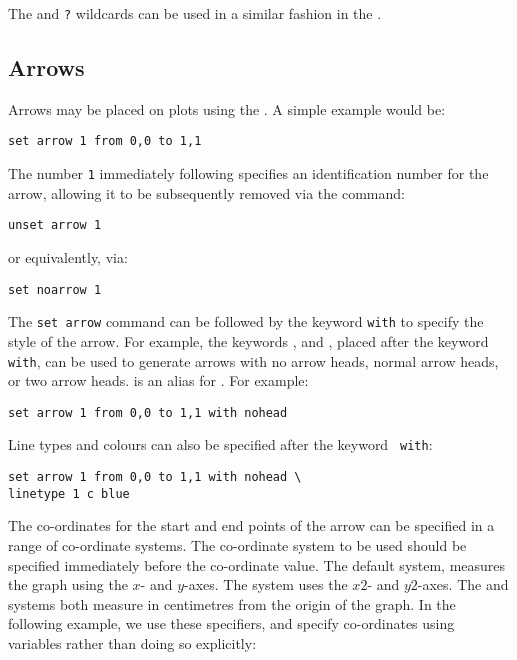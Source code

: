 The {\tt *} and {\tt ?} wildcards can be used in a similar fashion in the
.

\subsection{Arrows}

\label{sec:set_arrow} Arrows may be placed on plots using the
. A simple example would be:

\begin{verbatim}
set arrow 1 from 0,0 to 1,1
\end{verbatim}

\noindent The number {\tt 1} immediately following 
specifies an identification number for the arrow, allowing it to be
subsequently removed via the command:

\begin{verbatim}
unset arrow 1
\end{verbatim}

\noindent or equivalently, via:

\begin{verbatim}
set noarrow 1
\end{verbatim}

The {\tt set arrow} command can be followed by the keyword {\tt with} to
specify the style of the arrow. For example, the keywords ,
 and , placed after the keyword {\tt with}, can
be used to generate arrows with no arrow heads, normal arrow heads, or two
arrow heads.   is an alias for .  For example:

\begin{verbatim}
set arrow 1 from 0,0 to 1,1 with nohead
\end{verbatim}

\noindent Line types and colours can also be specified after the keyword {\tt
with}:

\begin{verbatim}
set arrow 1 from 0,0 to 1,1 with nohead \
linetype 1 c blue
\end{verbatim}

The co-ordinates for the start and end points of the arrow can be specified in
a range of co-ordinate systems. The co-ordinate system to be used should be
specified immediately before the co-ordinate value. The default system,
\indcot{first} measures the graph using the $x$- and $y$-axes. The
\indcot{second} system uses the $x2$- and $y2$-axes. The  and
\indcot{graph} systems both measure in centimetres from the origin of the
graph. In the following example, we use these specifiers, and specify
co-ordinates using variables rather than doing so explicitly:

